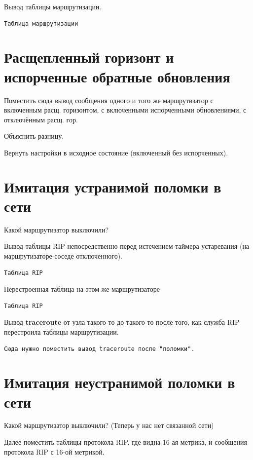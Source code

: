 \documentclass[a4paper,12pt]{article}
\begin{document}
Вывод таблицы маршрутизации.

\begin{Verbatim}
Таблица маршрутизации
\end{Verbatim}

\section{Расщепленный горизонт и испорченные обратные обновления}

Поместить сюда вывод сообщения одного и того же маршрутизатор с включенным расщ. горизонтом, с включенными испорченными обновлениями, с отключённым расщ. гор.

Объяснить разницу.

Вернуть настройки в исходное состояние (включенный без испорченных).

\section{Имитация устранимой поломки в сети}

Какой маршрутизатор выключили?

Вывод таблицы RIP непосредственно перед истечением таймера устаревания (на маршрутизаторе-соседе отключенного).

\begin{Verbatim}
Таблица RIP
\end{Verbatim}

Перестроенная таблица на этом же маршрутизаторе

\begin{Verbatim}
Таблица RIP
\end{Verbatim}


Вывод \textbf{traceroute} от узла такого-то до такого-то после того, как служба RIP перестроила таблицы маршрутизации.

\begin{Verbatim}
Сюда нужно поместить вывод traceroute после "поломки".
\end{Verbatim}

\section{Имитация неустранимой поломки в сети}

Какой маршрутизатор выключили? (Теперь у нас нет связанной сети)

Далее поместить таблицы протокола RIP, где видна 16-ая метрика, и сообщения протокола RIP с 16-ой метрикой.
\end{document}
